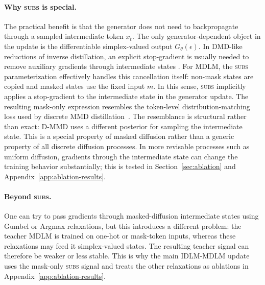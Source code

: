 \begin{reviewblock}
\paragraph{Why \textsc{subs} is special.}
The practical benefit is that the generator does not need to backpropagate
through a sampled intermediate token $x_t$. The only generator-dependent object
in the update is the differentiable simplex-valued output $G_\theta(\epsilon)$.
In DMD-like reductions of inverse distillation, an explicit stop-gradient is
usually needed to remove auxiliary gradients through intermediate states
\citep{selikhanovych2025one}. For MDLM, the \textsc{subs} parameterization
effectively handles this cancellation itself: non-mask states are copied and
masked states use the fixed input $m$. In this sense, \textsc{subs} implicitly
applies a stop-gradient to the intermediate state in the generator update. The
resulting mask-only expression resembles the token-level distribution-matching
loss used by discrete MMD distillation~\citep{hoogeboom2026beyond}.
The resemblance is structural rather than exact: D-MMD uses a different
posterior for sampling the intermediate state.
This is a special property of masked diffusion rather than a generic property
of all discrete diffusion processes. In more revisable processes such as
uniform diffusion, gradients through the intermediate state can change the
training behavior substantially; this is tested in Section~\ref{sec:ablation}
and Appendix~\ref{app:ablation-results}.

\paragraph{Beyond \textsc{subs}.}
One can try to pass gradients through masked-diffusion intermediate states
using Gumbel or Argmax relaxations, but this introduces a different problem:
the teacher MDLM is trained on one-hot or mask-token inputs, whereas these
relaxations may feed it simplex-valued states. The resulting teacher signal can
therefore be weaker or less stable. This is why the main IDLM-MDLM update uses
the mask-only \textsc{subs} signal and treats the other relaxations as
ablations in Appendix~\ref{app:ablation-results}.
\end{reviewblock}

\clearpage
\section{\texorpdfstring{}{Uniform Diffusion}}
\label{app:uniform process}

